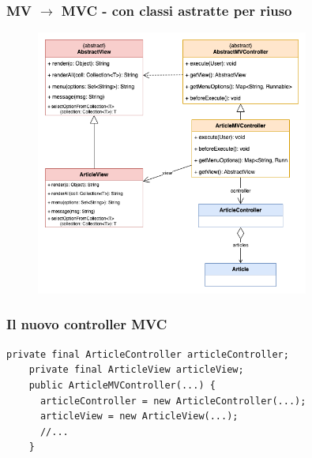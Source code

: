 \begin{frame}
    \frametitle{MV $\to$ MVC - con classi astratte per riuso}
    \begin{figure}
        \includegraphics[width=0.8\textwidth]{img/modello-vista_after.png}
    \end{figure}
\end{frame}

\begin{frame} [fragile]
    \frametitle{Il nuovo controller MVC}
    \begin{lstlisting}[autogobble, title={\texttt{ArticleMVController.java}}]
    private final ArticleController articleController;
    private final ArticleView articleView;
    public ArticleMVController(...) {
      articleController = new ArticleController(...);
      articleView = new ArticleView(...);
      //...
    }
    \end{lstlisting}
\end{frame}